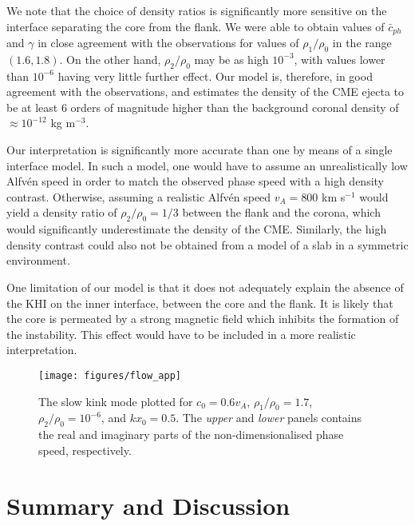 We note that the choice of density ratios is significantly more sensitive on the interface separating the core from the flank.
We were able to obtain values of $\bar c_{ph}$ and $\gamma$ in close agreement with the observations for values of $\rho_1/\rho_0$ in the range $(1.6 , 1.8)$.
On the other hand, $\rho_2/\rho_0$ may be as high $10^{-3}$, with values lower than $10^{-6}$ having very little further effect.
Our model is, therefore, in good agreement with the observations, and estimates the density of the CME ejecta to be at least 6 orders of magnitude higher than the background coronal density of $\approx 10^{-12}$ kg m$^{-3}$.

Our interpretation is significantly more accurate than one by means of a single interface model.
In such a model, one would have to assume an unrealistically low Alfv\'en speed in order to match the observed phase speed with a high density contrast.
Otherwise, assuming a realistic Alfv\'en speed $v_A = 800$ km s$^{-1}$ would yield a density ratio of $\rho_2 / \rho_0 = 1/3$ between the flank and the corona, which would significantly underestimate the density of the CME.
Similarly, the high density contrast could also not be obtained from a model of a slab in a symmetric environment.

One limitation of our model is that it does not adequately explain the absence of the KHI on the inner interface, between the core and the flank.
It is likely that the core is permeated by a strong magnetic field which inhibits the formation of the instability.
This effect would have to be included in a more realistic interpretation.

\begin{figure}[!t]
\centering
\texttt{[image: figures/flow\_app]}
\caption{The slow kink mode plotted for $c_0 = 0.6 v_A$, $\rho_1/\rho_0 = 1.7$, $\rho_2/\rho_0 = 10^{-6}$, and $k x_0 = 0.5$. The \textit{upper} and \textit{lower} panels contains the real and imaginary parts of the non-dimensionalised phase speed, respectively.}
\label{flow_app}
\end{figure}



\section{Summary and Discussion}
\label{sec:c2discussion}

